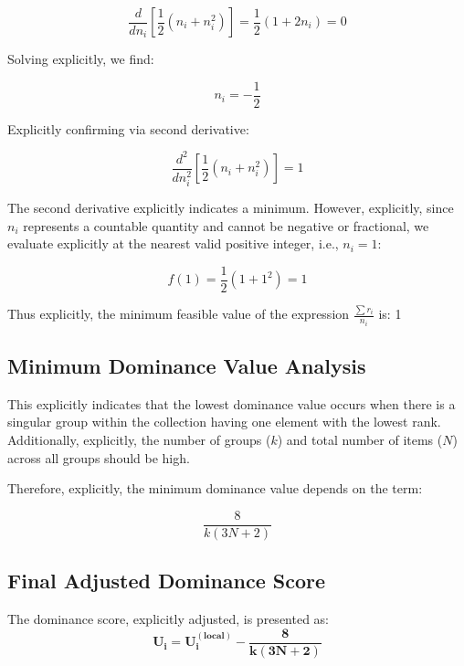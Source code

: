 \documentclass[man,floatsintext]{apa7}
\begin{document}
\begin{equation}
\frac{d}{d n_i}\left[\frac{1}{2}(n_i + n_i^2)\right] = \frac{1}{2}(1 + 2 n_i) = 0
\end{equation}

Solving explicitly, we find:

\begin{equation}
n_i = -\frac{1}{2}
\end{equation}

Explicitly confirming via second derivative:

\begin{equation}
\frac{d^2}{d n_i^2}\left[\frac{1}{2}(n_i + n_i^2)\right] = 1
\end{equation}

The second derivative explicitly indicates a minimum. However, explicitly, since $n_i$ represents a countable quantity and cannot be negative or fractional, we evaluate explicitly at the nearest valid positive integer, i.e., $n_i = 1$:

\begin{equation}
f(1) = \frac{1}{2}(1 + 1^2) = 1
\end{equation}

Thus explicitly, the minimum feasible value of the expression $\frac{\sum r_i}{n_i}$ is: 1

\subsection*{Minimum Dominance Value Analysis}

This explicitly indicates that the lowest dominance value occurs when there is a singular group within the collection having one element with the lowest rank. Additionally, explicitly, the number of groups ($k$) and total number of items ($N$) across all groups should be high.

Therefore, explicitly, the minimum dominance value depends on the term:

\begin{equation}
\frac{8}{k(3N+2)}
\end{equation}

\subsection{Final Adjusted Dominance Score}

The dominance score, explicitly adjusted, is presented as:
\begin{equation}
\mathbf{
U_i = U_i^{(local)} - \frac{8}{k(3N+2)}
}
\end{equation}
\end{document}
